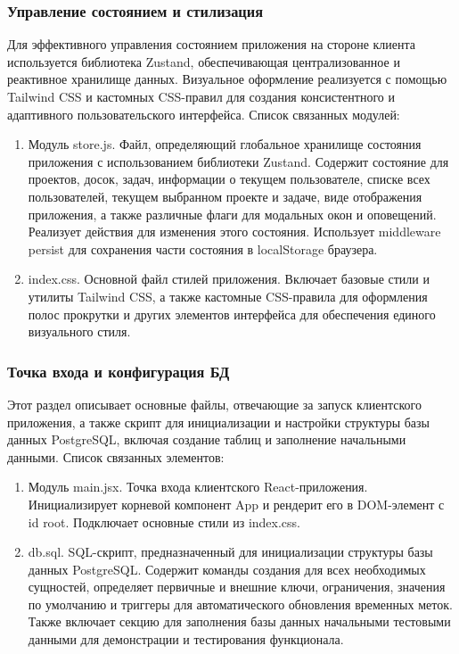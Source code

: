 \subsubsection{Управление состоянием и стилизация}
Для эффективного управления состоянием приложения на стороне клиента используется библиотека Zustand, обеспечивающая централизованное и реактивное хранилище данных. Визуальное оформление реализуется с помощью Tailwind CSS и кастомных CSS-правил для создания консистентного и адаптивного пользовательского интерфейса. Список связанных модулей:
\begin{enumerate}
	\item Модуль store.js. Файл, определяющий глобальное хранилище состояния приложения с использованием библиотеки Zustand. Содержит состояние для проектов, досок, задач, информации о текущем пользователе, списке всех пользователей, текущем выбранном проекте и задаче, виде отображения приложения, а также различные флаги для модальных окон и оповещений. Реализует действия для изменения этого состояния. Использует middleware persist для сохранения части состояния в localStorage браузера.
	\item index.css. Основной файл стилей приложения. Включает базовые стили и утилиты Tailwind CSS, а также кастомные CSS-правила для оформления полос прокрутки и других элементов интерфейса для обеспечения единого визуального стиля.
\end{enumerate}

\subsubsection{Точка входа и конфигурация БД}
Этот раздел описывает основные файлы, отвечающие за запуск клиентского приложения, а также скрипт для инициализации и настройки структуры базы данных PostgreSQL, включая создание таблиц и заполнение начальными данными. Список связанных элементов:
\begin{enumerate}
	\item Модуль main.jsx. Точка входа клиентского React-приложения. Инициализирует корневой компонент App и рендерит его в DOM-элемент с id root. Подключает основные стили из index.css.
	\item db.sql. SQL-скрипт, предназначенный для инициализации структуры базы данных PostgreSQL. Содержит команды создания для всех необходимых сущностей, определяет первичные и внешние ключи, ограничения, значения по умолчанию и триггеры для автоматического обновления временных меток. Также включает секцию для заполнения базы данных начальными тестовыми данными для демонстрации и тестирования функционала.
\end{enumerate}

